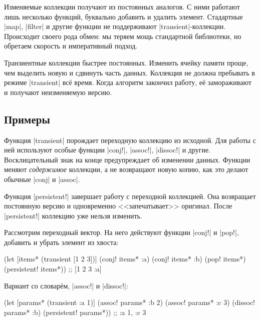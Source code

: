 Изменяемые коллекции получают из постоянных аналогов. С ними работают лишь
несколько функций, буквально добавить и удалить элемент. Стадартные
\spverb|map|, \spverb|filter| и другие функции не поддерживают
\spverb|transient|-коллекции. Происходит своего рода обмен: мы теряем мощь
стандартной библиотеки, но обретаем скорость и императивный подход.

Транзиентные коллекции быстрее постоянных. Изменить ячейку памяти проще, чем
выделить новую и сдвинуть часть данных. Коллекция не должна пребывать в режиме
\spverb|transient| вс\"{е} время. Когда алгоритм закончил работу, е\"{е}
замораживают и получают неизменяемую версию.

\subsection{Примеры}

Функция \spverb|transient| порождает переходную коллекцию из исходной. Для
работы с ней используют особые функции \spverb|conj!|, \spverb|assoc!|,
\spverb|dissoc!| и другие. Восклицательный знак на конце предупреждает об
изменении данных. Функции меняют \emph{содержимое} коллекции, а не возвращают
новую копию, как это делают обычные \spverb|conj| и \spverb|assoc|.


Функция \spverb|persistent!| завершает работу с переходной коллекцией. Она
возвращает постоянную версию и одновременно <<запечатывает>> оригинал. После
\spverb|persistent!| коллекцию уже нельзя изменить.

Рассмотрим переходный вектор. На него действуют функции \spverb|conj!| и
\spverb|pop!|, добавить и убрать элемент из хвоста:

\begin{english}
  \begin{clojure}
(let [items* (transient [1 2 3])]
  (conj! items* :a)
  (conj! items* :b)
  (pop! items*)
  (persistent! items*))
;; [1 2 3 :a]
  \end{clojure}
\end{english}


\noindent
Вариант со словар\"{е}м, \spverb|assoc!| и \spverb|dissoc!|:

\begin{english}
  \begin{clojure}
(let [params* (transient {:a 1})]
  (assoc! params* :b 2)
  (assoc! params* :c 3)
  (dissoc! params* :b)
  (persistent! params*))
;; {:a 1, :c 3}
  \end{clojure}
\end{english}

